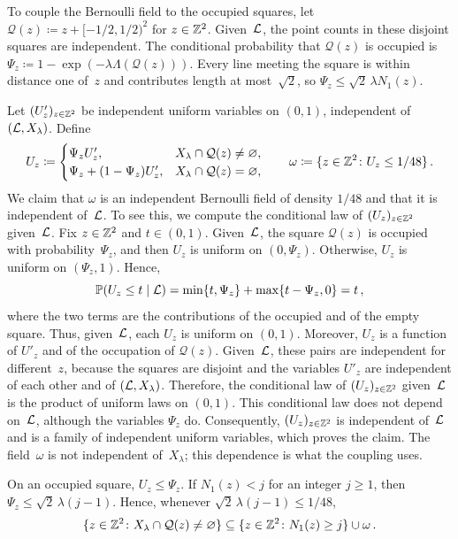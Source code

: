 \documentclass[11pt,letterpaper]{article}
\begin{document}
To couple the Bernoulli field to the occupied squares, let $\mathcal Q(z)\coloneqq z+[-1/2,1/2)^2$ for $z\in\mathbb Z^2$. Given~$\mathcal L$, the point counts in these disjoint squares are independent. The conditional probability that $\mathcal Q(z)$ is occupied is $\Psi_z\coloneqq 1-\exp(-\lambda\Lambda(\mathcal Q(z)))$. Every line meeting the square is within distance one of~$z$ and contributes length at most~$\sqrt2$, so $\Psi_z\le\sqrt2\,\lambda N_1(z)$.

Let $(U'_z)_{z\in\mathbb Z^2}$ be independent uniform variables on $(0,1)$, independent of $(\mathcal L,X_\lambda)$. Define
\begin{equation*}
  U_z\coloneqq
  \begin{cases}
    \Psi_z U'_z, & X_\lambda\cap\mathcal Q(z)\ne\varnothing,\\
    \Psi_z+(1-\Psi_z)U'_z, & X_\lambda\cap\mathcal Q(z)=\varnothing,
  \end{cases}
  \qquad \omega\coloneqq\{z\in\mathbb Z^2\colon U_z\le 1/48\}\,.
\end{equation*}
We claim that $\omega$ is an independent Bernoulli field of density $1/48$ and that it is independent of~$\mathcal L$. To see this, we compute the conditional law of $(U_z)_{z\in\mathbb Z^2}$ given~$\mathcal L$. Fix $z\in\mathbb Z^2$ and $t\in(0,1)$. Given~$\mathcal L$, the square $\mathcal Q(z)$ is occupied with probability~$\Psi_z$, and then $U_z$ is uniform on $(0,\Psi_z)$. Otherwise, $U_z$ is uniform on $(\Psi_z,1)$. Hence,
\begin{equation*}
  \mathbb P(U_z\le t\mid\mathcal L)
  =\min\{t,\Psi_z\}+\max\{t-\Psi_z,0\}
  =t\,,
\end{equation*}
where the two terms are the contributions of the occupied and of the empty square. Thus, given~$\mathcal L$, each $U_z$ is uniform on $(0,1)$. Moreover, $U_z$ is a function of $U'_z$ and of the occupation of $\mathcal Q(z)$. Given~$\mathcal L$, these pairs are independent for different~$z$, because the squares are disjoint and the variables $U'_z$ are independent of each other and of $(\mathcal L,X_\lambda)$. Therefore, the conditional law of $(U_z)_{z\in\mathbb Z^2}$ given~$\mathcal L$ is the product of uniform laws on $(0,1)$. This conditional law does not depend on~$\mathcal L$, although the variables $\Psi_z$ do. Consequently, $(U_z)_{z\in\mathbb Z^2}$ is independent of~$\mathcal L$ and is a family of independent uniform variables, which proves the claim. The field~$\omega$ is not independent of~$X_\lambda$; this dependence is what the coupling uses.

On an occupied square, $U_z\le\Psi_z$. If $N_1(z)<j$ for an integer $j\ge1$, then $\Psi_z\le\sqrt2\,\lambda(j-1)$. Hence, whenever $\sqrt2\,\lambda(j-1)\le 1/48$,
\begin{equation*}
  \{z\in\mathbb Z^2\colon X_\lambda\cap\mathcal Q(z)\ne\varnothing\}
  \subseteq \{z\in\mathbb Z^2\colon N_1(z)\ge j\}\cup\omega\,.
\end{equation*}
\end{document}

